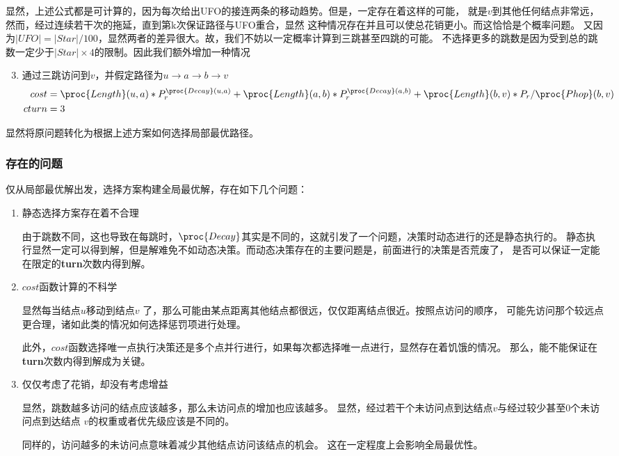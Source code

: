 \documentclass[hyperref,UTF8]{ctexart}
\theoremstyle{definition}
\theoremstyle{remark}
\numberwithin{equation}{subsection}
\newcommand{\Emph}{\textbf}
\begin{document}
	显然，上述公式都是可计算的，因为每次给出UFO的接连两条的移动趋势。但是，一定存在着这样的可能，
	就是$v$到其他任何结点非常远，然而，经过连续若干次的拖延，直到第k次保证路径与UFO重合，显然
	这种情况存在并且可以使总花销更小。而这恰恰是个概率问题。
	又因为$|UFO| = |Star|/100$，显然两者的差异很大。故，我们不妨以一定概率计算到三跳甚至四跳的可能。
	不选择更多的跳数是因为受到总的跳数一定少于$|Star| \times 4$的限制。因此我们额外增加一种情况
	\begin{enumerate}[(1)]
	\setcounter{enumi}{2}
		
		\item 通过三跳访问到$v$，并假定路径为$u \rightarrow a \rightarrow b \rightarrow v$
		\begin{align*}
			cost	&= \proc{Length}(u, a) * P_r^{\proc{Decay}(u, a)} + \proc{Length}(a, b) * P_r^{\proc{Decay}(a, b)} + \proc{Length}(b, v) * P_r / \proc{Phop}(b, v)	\\
			cturn	&= 3
		\end{align*}
		
	\end{enumerate}
	
	显然将原问题转化为根据上述方案如何选择局部最优路径。
	
\subsubsection{存在的问题}

	仅从局部最优解出发，选择方案构建全局最优解，存在如下几个问题：
	\begin{enumerate}[(1)]
		
		\item 静态选择方案存在着不合理
		
		由于跳数不同，这也导致在每跳时，$\proc{Decay}$其实是不同的，这就引发了一个问题，决策时动态进行的还是静态执行的。
		静态执行显然一定可以得到解，但是解难免不如动态决策。而动态决策存在的主要问题是，前面进行的决策是否荒废了，
		是否可以保证一定能在限定的\Emph{turn}次数内得到解。
		
		\item $cost$函数计算的不科学
		
		显然每当结点$u$移动到结点$v$ 了，那么可能由某点距离其他结点都很远，仅仅距离结点很近。按照点访问的顺序，
		可能先访问那个较远点更合理，诸如此类的情况如何选择惩罚项进行处理。
		
		此外，$cost$函数选择唯一点执行决策还是多个点并行进行，如果每次都选择唯一点进行，显然存在着饥饿的情况。
		那么，能不能保证在\Emph{turn}次数内得到解成为关键。
		
		\item  仅仅考虑了花销，却没有考虑增益
		
		显然，跳数越多访问的结点应该越多，那么未访问点的增加也应该越多。
		显然，经过若干个未访问点到达结点$v$与经过较少甚至0个未访问点到达结点
		$v$的权重或者优先级应该是不同的。
		
		同样的，访问越多的未访问点意味着减少其他结点访问该结点的机会。
		这在一定程度上会影响全局最优性。
		
	\end{enumerate}
	
\end{document}
